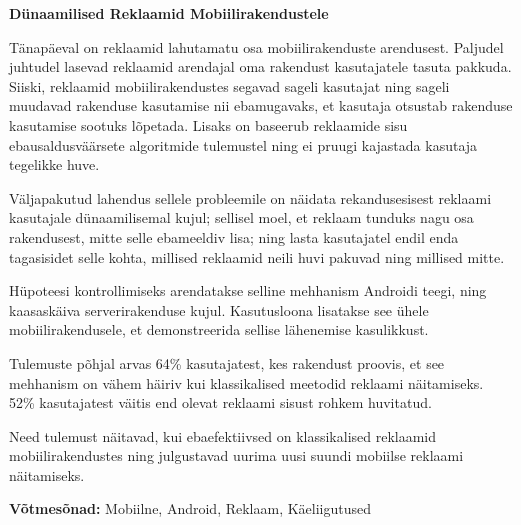 \begin{abstracts}

\textbf{D\"{u}naamilised Reklaamid Mobiilirakendustele}

T\"{a}nap\"{a}eval on reklaamid lahutamatu osa mobiilirakenduste arendusest. Paljudel juhtudel lasevad reklaamid arendajal oma rakendust kasutajatele tasuta pakkuda. Siiski, reklaamid mobiilirakendustes segavad sageli kasutajat ning sageli muudavad rakenduse kasutamise nii ebamugavaks, et kasutaja otsustab rakenduse kasutamise sootuks l\~{o}petada. Lisaks on baseerub reklaamide sisu ebausaldusv\"{a}\"{a}rsete algoritmide tulemustel ning ei pruugi kajastada kasutaja tegelikke huve.

V\"{a}ljapakutud lahendus sellele probleemile on n\"{a}idata rekandusesisest reklaami kasutajale d\"{u}naamilisemal kujul; sellisel moel, et reklaam tunduks nagu osa rakendusest, mitte selle ebameeldiv lisa; ning lasta kasutajatel endil enda tagasisidet selle kohta, millised reklaamid neili huvi pakuvad ning millised mitte.

H\"{u}poteesi kontrollimiseks arendatakse selline mehhanism Androidi teegi, ning kaasask\"{a}iva serverirakenduse kujul. Kasutusloona lisatakse see \"{u}hele mobiilirakendusele, et demonstreerida sellise lähenemise kasulikkust.

Tulemuste p\~{o}hjal arvas 64\% kasutajatest, kes rakendust proovis, et see mehhanism on v\"{a}hem h\"{a}iriv kui klassikalised meetodid reklaami n\"{a}itamiseks. 52\% kasutajatest v\"{a}itis end olevat reklaami sisust rohkem huvitatud.

Need tulemust n\"{a}itavad, kui ebaefektiivsed on klassikalised reklaamid mobiilirakendustes ning julgustavad uurima uusi suundi mobiilse reklaami n\"{a}itamiseks.

\bigskip

\textbf{V\~{o}tmes\~{o}nad:} Mobiilne, Android, Reklaam, K\"{a}eliigutused

\end{abstracts}